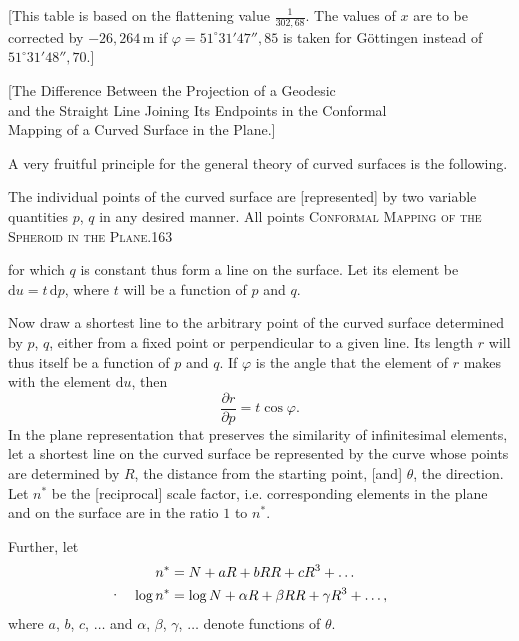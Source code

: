 [This table is based on the flattening value $\frac1{302{,}68}$. The values of $x$ are to be corrected by $-26{,}264\,\mathrm m$ if $\varphi=51^\circ31'47''{,}85$ is taken for Göttingen instead of $51^\circ31'48''{,}70$.]
\bigskip
\begin{center}
[The Difference Between the Projection of a Geodesic\\and the Straight Line Joining Its Endpoints in the Conformal\\Mapping of a Curved Surface in the Plane.]\par\medskip
[16.]
\end{center}
A very fruitful principle for the general theory of curved surfaces is the following.

The individual points of the curved surface are [represented] by two variable quantities $p$, $q$ in any desired manner. All points
\clearpage
\noindent\mbox{}\hfill\textsc{Conformal Mapping of the Spheroid in the Plane.}\hfill163\par\medskip
\noindent for which $q$ is constant thus form a line on the surface. Let its element be $\mathrm du=t\,\mathrm dp$, where $t$ will be a function of $p$ and $q$.

Now draw a shortest line to the arbitrary point of the curved surface determined by $p$, $q$, either from a fixed point or perpendicular to a given line. Its length $r$ will thus itself be a function of $p$ and $q$. If $\varphi$ is the angle that the element of $r$ makes with the element $\mathrm du$, then
\[
\frac{\partial r}{\partial p}=t\cos\varphi.
\]
In the plane representation that preserves the similarity of infinitesimal elements, let a shortest line on the curved surface be represented by the curve whose points are determined by $R$, the distance from the starting point, [and] $\theta$, the direction. Let $n^*$ be the [reciprocal] scale factor, i.e. corresponding elements in the plane and on the surface are in the ratio $1$ to $n^*$.

Further, let
\[
\begin{aligned}
n^*&=N+aR+bRR+cR^3+\ldots\\
\rlap{\hspace{-1.4em}\raisebox{.7ex}{.}}\log n^*&=\log N+\alpha R+\beta RR+\gamma R^3+\ldots,
\end{aligned}
\]
where $a$, $b$, $c$, $\ldots$ and $\alpha$, $\beta$, $\gamma$, $\ldots$ denote functions of $\theta$.

